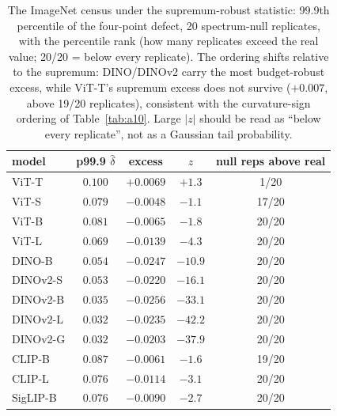 \begin{table}[H]
\centering
\small
\begin{tabular}{lcccc}
\toprule
model & p99.9 $\hat\delta$ & excess & $z$ & null reps above real \\
\midrule
ViT-T & $0.100$ & $+0.0069$ & $+1.3$ & 1/20 \\
ViT-S & $0.079$ & $-0.0048$ & $-1.1$ & 17/20 \\
ViT-B & $0.081$ & $-0.0065$ & $-1.8$ & 20/20 \\
ViT-L & $0.069$ & $-0.0139$ & $-4.3$ & 20/20 \\
\midrule
DINO-B & $0.054$ & $-0.0247$ & $-10.9$ & 20/20 \\
DINOv2-S & $0.053$ & $-0.0220$ & $-16.1$ & 20/20 \\
DINOv2-B & $0.035$ & $-0.0256$ & $-33.1$ & 20/20 \\
DINOv2-L & $0.032$ & $-0.0235$ & $-42.2$ & 20/20 \\
DINOv2-G & $0.032$ & $-0.0203$ & $-37.9$ & 20/20 \\
\midrule
CLIP-B & $0.087$ & $-0.0061$ & $-1.6$ & 19/20 \\
CLIP-L & $0.076$ & $-0.0114$ & $-3.1$ & 20/20 \\
SigLIP-B & $0.076$ & $-0.0090$ & $-2.7$ & 20/20 \\
\bottomrule
\end{tabular}
\caption{The ImageNet census under the supremum-robust statistic: 99.9th percentile of the four-point defect, 20 spectrum-null replicates, with the percentile rank (how many replicates exceed the real value; 20/20 = below every replicate). The ordering shifts relative to the supremum: DINO/DINOv2 carry the most budget-robust excess, while ViT-T's supremum excess does not survive ($+0.007$, above 19/20 replicates), consistent with the curvature-sign ordering of Table~\ref{tab:a10}. Large $|z|$ should be read as ``below every replicate'', not as a Gaussian tail probability.}
\label{tab:b18-p999}
\end{table}
